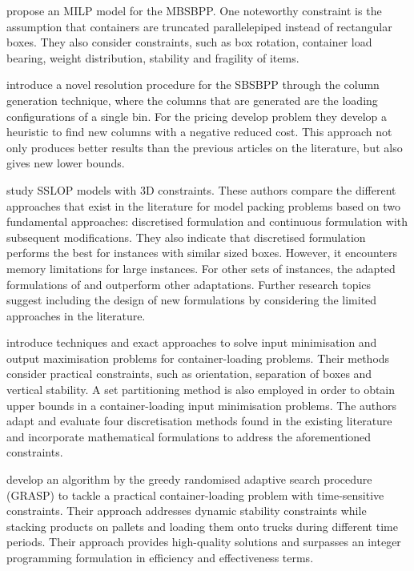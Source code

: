 \autocite{2016Paquay} propose an MILP model for the MBSBPP.  One noteworthy constraint is the assumption that containers are truncated parallelepiped instead of rectangular boxes. They also consider constraints, such as box rotation, container load bearing, weight distribution, stability and fragility of items.

\autocite{Mahvash2018} introduce a novel resolution procedure for the SBSBPP through the column generation technique, where the columns that are generated are the loading configurations of a single bin. For the pricing develop problem they develop a heuristic to find new columns with a negative reduced cost.  This approach not only produces better results than the previous articles on the literature, but also gives new lower bounds.




\autocite{Silva2019ExactProblems} study SSLOP models with 3D constraints. These authors compare the different approaches that exist in the literature for model packing problems based on two fundamental approaches: discretised formulation \autocite{Junqueira2013AnConstraints} and continuous formulation \autocite{Chen1995EUROPEANProblem} with subsequent modifications. They also indicate that discretised formulation\autocite{Junqueira2012MIP-basedConstraints} performs the best for instances with similar sized boxes. However, it encounters memory limitations for large instances. For other sets of instances, the adapted formulations of \autocite{Chen1995EUROPEANProblem} and \autocite{2016Paquay} outperform other adaptations. Further research topics suggest including the design of new formulations by considering the limited approaches in the literature.



\autocite{Kurpel2020TheProblems} introduce techniques and exact approaches to solve input minimisation and output maximisation problems for container-loading problems. Their methods consider practical constraints, such as orientation, separation of boxes and vertical stability. A set partitioning method is also employed in order to obtain upper bounds in a  container-loading input minimisation problems. The authors adapt and evaluate four discretisation methods found in the existing literature and incorporate mathematical formulations to address the aforementioned constraints.



\autocite{Alonso2020AConstraints} develop an algorithm by the greedy randomised adaptive search procedure (GRASP) to tackle a practical container-loading problem with time-sensitive constraints. Their approach addresses dynamic stability constraints while stacking products on pallets and loading them onto trucks during different time periods. Their approach provides high-quality solutions and surpasses an integer programming formulation in efficiency and effectiveness terms.

